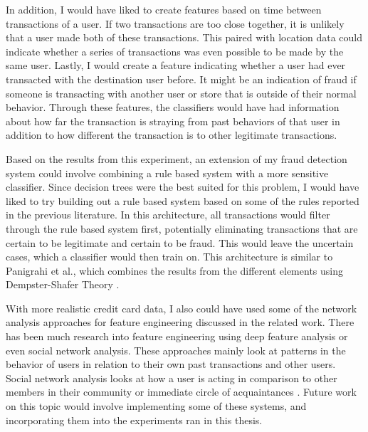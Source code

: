 \documentclass[midd]{thesis}
\begin{document}
In addition, I would have liked to create features based on time between transactions of a user. If two transactions are too close together, it is unlikely that a user made both of these transactions. This paired with location data could indicate whether a series of transactions was even possible to be made by the same user. Lastly, I would create a feature indicating whether a user had ever transacted with the destination user before. It might be an indication of fraud if someone is transacting with another user or store that is outside of their normal behavior. Through these features, the classifiers would have had information about how far the transaction is straying from past behaviors of that user in addition to how different the transaction is to other legitimate transactions.

Based on the results from this experiment, an extension of my fraud detection system could involve combining a rule based system with a more sensitive classifier. Since decision trees were the best suited for this problem, I would have liked to try building out a rule based system based on some of the rules reported in the previous literature. In this architecture, all transactions would filter through the rule based system first, potentially eliminating transactions that are certain to be legitimate and certain to be fraud. This would leave the uncertain cases, which a classifier would then train on. This architecture is similar to Panigrahi et al., which combines the results from the different elements using Dempster-Shafer Theory \cite{Panigrahi2009}.

With more realistic credit card data, I also could have used some of the network analysis approaches for feature engineering discussed in the related work. There has been much research into feature engineering using deep feature analysis or even social network analysis. These approaches mainly look at patterns in the behavior of users in relation to their own past transactions and other users. Social network analysis looks at how a user is acting in comparison to other members in their community or immediate circle of acquaintances \cite{Baesens}. Future work on this topic would involve implementing some of these systems, and incorporating them into the experiments ran in this thesis.   
\end{document}
